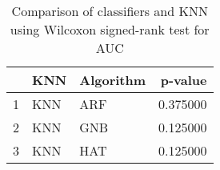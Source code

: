 \begin{table}
\footnotesize
\caption{Comparison of classifiers and KNN using Wilcoxon signed-rank test for AUC}
\label{tab:KNN wilcoxon AUC comparison}
\begin{tabular}{lllr}
\hline
 & KNN & Algorithm & p-value \\
\hline
1 & KNN & ARF & 0.375000 \\
2 & KNN & GNB & 0.125000 \\
3 & KNN & HAT & 0.125000 \\
\hline
\end{tabular}
\end{table}
